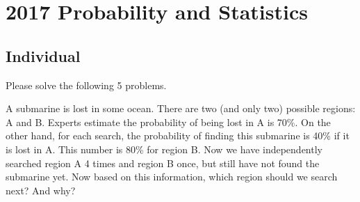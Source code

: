 \section{2017 Probability and Statistics}

\subsection{Individual}
Please solve the following 5 problems.

\begin{exercise}\label{probability:2017:1}
A submarine is lost in some ocean. There are two (and only two) possible regions: A and B. Experts estimate the probability of being lost in A is 70\%. On the other hand, for each search, the probability of finding this submarine is 40\% if it is lost in A. This number is 80\% for region B. Now we have independently searched region A 4 times and region B once, but still have not found the submarine yet. Now based on this information, which region should we search next? And why?
\end{exercise}

